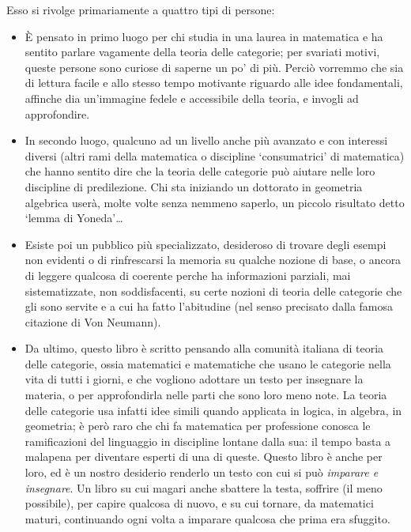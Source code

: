 Esso si rivolge primariamente a quattro tipi di persone:
\begin{itemize}
	\item \`E pensato in primo luogo per chi studia in una laurea in matematica e ha sentito parlare vagamente della teoria delle categorie; per svariati motivi, queste persone sono curiose di saperne un po' di più. Perciò vorremmo che sia di lettura facile e allo stesso tempo motivante riguardo alle idee fondamentali, affinche dia un'immagine fedele e accessibile della teoria, e invogli ad approfondire.
	\item In secondo luogo, qualcuno ad un livello anche più avanzato e con interessi diversi (altri rami della matematica o discipline `consumatrici' di matematica) che hanno sentito dire che la teoria delle categorie pu\`o aiutare nelle loro discipline di predilezione. Chi sta iniziando un dottorato in geometria algebrica userà, molte volte senza nemmeno saperlo, un piccolo risultato detto `lemma di Yoneda'\dots
	\item Esiste poi un pubblico pi\`u specializzato, desideroso di trovare degli esempi non evidenti o di rinfrescarsi la memoria su qualche nozione di base, o ancora di leggere qualcosa di coerente perche ha informazioni parziali, mai sistematizzate, non soddisfacenti, su certe nozioni di teoria delle categorie che gli sono servite e a cui ha fatto l'abitudine (nel senso precisato dalla famosa citazione di Von Neumann).
	\item Da ultimo, questo libro è scritto pensando alla comunità italiana di teoria delle categorie, ossia matematici e matematiche che usano le categorie nella vita di tutti i giorni, e che vogliono adottare un testo per insegnare la materia, o per approfondirla nelle parti che sono loro meno note. La teoria delle categorie usa infatti idee simili quando applicata in logica, in algebra, in geometria; è però raro che chi fa matematica per professione conosca le ramificazioni del linguaggio in discipline lontane dalla sua: il tempo basta a malapena per diventare esperti di una di queste. Questo libro è anche per loro, ed è un nostro desiderio renderlo un testo con cui si può \emph{imparare e insegnare}. Un libro su cui magari anche sbattere la testa, soffrire (il meno possibile), per capire qualcosa di nuovo, e su cui tornare, da matematici maturi, continuando ogni volta a imparare qualcosa che prima era sfuggito.
\end{itemize}
\Todo{}


